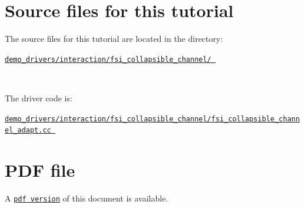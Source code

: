  

\hypertarget{index_sources}{}\section{Source files for this tutorial}\label{index_sources}

\begin{DoxyItemize}
\item The source files for this tutorial are located in the directory\+:~\newline
~\newline
\begin{center} \href{../../../../demo_drivers/interaction/fsi_collapsible_channel/}{\tt demo\+\_\+drivers/interaction/fsi\+\_\+collapsible\+\_\+channel/ } \end{center} ~\newline

\item The driver code is\+: ~\newline
~\newline
\begin{center} \href{../../../../demo_drivers/interaction/fsi_collapsible_channel/fsi_collapsible_channel_adapt.cc}{\tt demo\+\_\+drivers/interaction/fsi\+\_\+collapsible\+\_\+channel/fsi\+\_\+collapsible\+\_\+channel\+\_\+adapt.\+cc } \end{center} 
\end{DoxyItemize}

 

 \hypertarget{index_pdf}{}\section{P\+D\+F file}\label{index_pdf}
A \href{../latex/refman.pdf}{\tt pdf version} of this document is available. 

